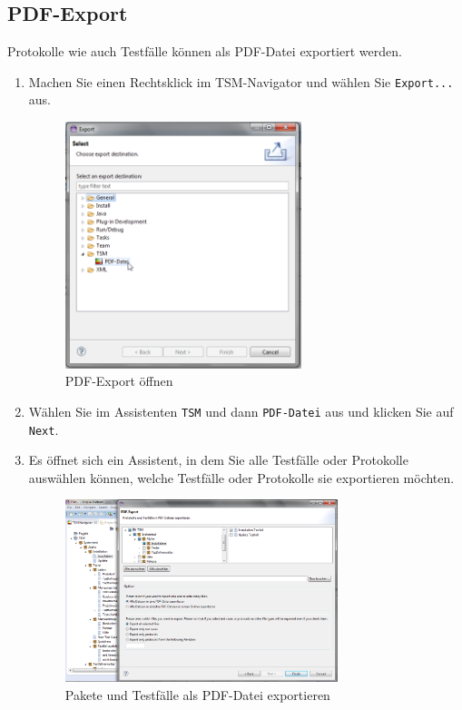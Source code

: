 \documentclass[11pt,a4paper,titlepage]{article}
\begin{document}
\subsection{PDF-Export}
Protokolle wie auch Testfälle können als PDF-Datei exportiert werden.
\begin{enumerate}

\item Machen Sie einen Rechtsklick im TSM-Navigator und wählen Sie \texttt{Export...} aus.

\begin{figure}[H]
\centering
\includegraphics[width= 260px]{BilderHandbuch/PDF/ExportA.png}
\caption{PDF-Export öffnen}
\label{fig:ExportA}
\end{figure}

\item Wählen Sie im Assistenten \texttt{TSM} und dann \texttt{PDF-Datei} aus und klicken Sie auf \texttt{Next}.
\item Es öffnet sich ein Assistent, in dem Sie alle Testfälle oder Protokolle auswählen können, welche Testfälle oder Protokolle sie exportieren möchten.

\begin{figure}[H]
\centering
\includegraphics[width= 300px]{BilderHandbuch/PDF/ExportB.png}
\caption{Pakete und Testfälle als PDF-Datei exportieren}
\label{fig:ExportB}
\end{figure}


\end{enumerate}
\end{document}
